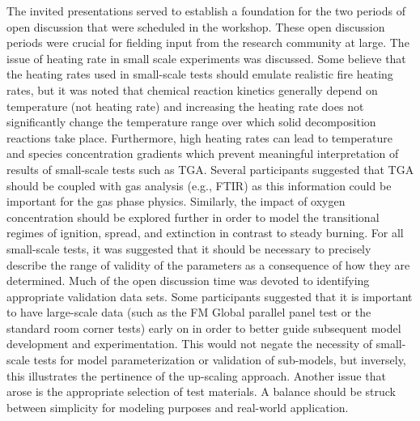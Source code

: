 The invited presentations served to establish a foundation for the two periods of open discussion that were scheduled in the workshop.  These open discussion periods were crucial for fielding input from the research community at large.  The issue of heating rate in small scale experiments was discussed.  Some believe that the heating rates used in small-scale tests should emulate realistic fire heating rates, but it was noted that chemical reaction kinetics generally depend on temperature (not heating rate) and increasing the heating rate does not significantly change the temperature range over which solid decomposition reactions take place.  Furthermore, high heating rates can lead to temperature and species concentration gradients which prevent meaningful interpretation of results of small-scale tests such as TGA.  Several participants suggested that TGA should be coupled with gas analysis (e.g., FTIR) as this information could be important for the gas phase physics.  Similarly, the impact of oxygen concentration should be explored further in order to model the transitional regimes of ignition, spread, and extinction in contrast to steady burning.  For all small-scale tests, it was suggested that it should be necessary to precisely describe the range of validity of the parameters as a consequence of how they are determined.  Much of the open discussion time was devoted to identifying appropriate validation data sets.  Some participants suggested that it is important to have large-scale data (such as the FM Global parallel panel test or the standard room corner tests) early on in order to better guide subsequent model development and experimentation.  This would not negate the necessity of small-scale tests for model parameterization or validation of sub-models, but inversely, this illustrates the pertinence of the up-scaling approach. Another issue that arose is the appropriate selection of test materials.  A balance should be struck between simplicity for modeling purposes and real-world application.


